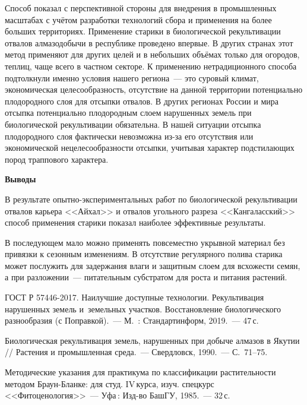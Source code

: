 

Способ показал с перспективной стороны для внедрения в промышленных масштабах с учётом разработки технологий сбора и применения на более больших территориях. Применение старики в биологической рекультивации отвалов алмазодобычи в республике проведено впервые. В других странах этот метод применяют для других целей и в небольших объёмах только для огородов, теплиц, чаще всего в частном секторе. К применению нетрадиционного способа подтолкнули именно условия нашего региона~--- это суровый климат, экономическая целесообразность, отсутствие на данной территории потенциально плодородного слоя для отсыпки отвалов.
\clearpage
В других регионах России и мира отсыпка потенциально плодородным слоем нарушенных земель при биологической рекультивации обязательна. В нашей ситуации отсыпка плодородного слоя фактически невозможна из-за его отсутствия или экономической нецелесообразности отсыпки, учитывая характер подстилающих пород траппового характера.

\textbf{Выводы}

В результате опытно-экспериментальных работ по биологической рекультивации отвалов карьера <<Айхал>> и отвалов угольного разреза <<Кангаласский>> способ применения старики показал наиболее эффективные результаты.

В последующем мало можно применять повсеместно укрывной материал без привязки к сезонным изменениям. В отсутствие регулярного полива старика может послужить для задержания влаги и защитным слоем для всхожести семян, а при разложении~--- питательным субстратом для роста и питания растений.

\begin{thebibliography}{99}


\bibitem{}
ГОСТ Р 57446-2017. Наилучшие доступные технологии. Рекультивация нарушенных земель и~земельных участков. Восстановление биологического разнообразия (с Поправкой).~--- М.~: Стандартинформ, 2019.~--- 47\,с.


\bibitem{}
 Биологическая рекультивация земель, нарушенных при добыче алмазов в Якутии // Растения и промышленная среда.~--- Свердловск, 1990.~--- С.~71--75.

\bibitem{}
 Методические указания для практикума по классификации растительности методом Браун-Бланке: для студ. IV\,курса, изуч. спецкурс <<Фитоценология>>~--- Уфа\,: Изд-во БашГУ, 1985.~--- 32\,с.

\end{thebibliography}
\thispagestyle{empty}
